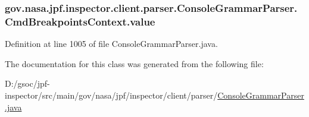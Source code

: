\subsubsection[{\texorpdfstring{value}{value}}]{ gov.\+nasa.\+jpf.\+inspector.\+client.\+parser.\+Console\+Grammar\+Parser.\+Cmd\+Breakpoints\+Context.\+value}\hypertarget{classgov_1_1nasa_1_1jpf_1_1inspector_1_1client_1_1parser_1_1_console_grammar_parser_1_1_cmd_breakpoints_context_a63c4310bd15c130c841d942db8cbf27a}{}\label{classgov_1_1nasa_1_1jpf_1_1inspector_1_1client_1_1parser_1_1_console_grammar_parser_1_1_cmd_breakpoints_context_a63c4310bd15c130c841d942db8cbf27a}


Definition at line 1005 of file Console\+Grammar\+Parser.\+java.



The documentation for this class was generated from the following file\+:\begin{DoxyCompactItemize}
\item 
D\+:/gsoc/jpf-\/inspector/src/main/gov/nasa/jpf/inspector/client/parser/\hyperlink{_console_grammar_parser_8java}{Console\+Grammar\+Parser.\+java}\end{DoxyCompactItemize}
